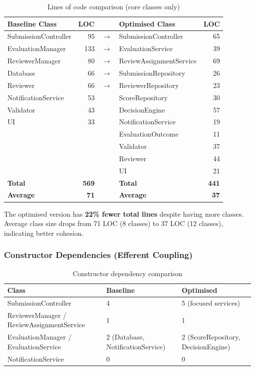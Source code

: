 \documentclass[12pt, a4paper]{article}
\begin{document}
\begin{table}[H]
\centering
\caption{Lines of code comparison (core classes only)}
\label{tab:loc}
\begin{tabular}{l r c l r}
    \toprule
    \textbf{Baseline Class} & \textbf{LOC} & & \textbf{Optimised Class} & \textbf{LOC} \\
    \midrule
    SubmissionController & 95 & $\rightarrow$ & SubmissionController & 65 \\
    EvaluationManager & 133 & $\rightarrow$ & EvaluationService & 39 \\
    ReviewerManager & 80 & $\rightarrow$ & ReviewAssignmentService & 69 \\
    Database & 66 & $\rightarrow$ & SubmissionRepository & 26 \\
    Reviewer & 66 & $\rightarrow$ & ReviewerRepository & 23 \\
    NotificationService & 53 & & ScoreRepository & 30 \\
    Validator & 43 & & DecisionEngine & 57 \\
    UI & 33 & & NotificationService & 19 \\
    & & & EvaluationOutcome & 11 \\
    & & & Validator & 37 \\
    & & & Reviewer & 44 \\
    & & & UI & 21 \\
    \midrule
    \textbf{Total} & \textbf{569} & & \textbf{Total} & \textbf{441} \\
    \textbf{Average} & \textbf{71} & & \textbf{Average} & \textbf{37} \\
    \bottomrule
\end{tabular}
\end{table}

The optimised version has \textbf{22\% fewer total lines} despite having more classes. Average class size drops from 71 LOC (8 classes) to 37 LOC (12 classes), indicating better cohesion.

\subsubsection{Constructor Dependencies (Efferent Coupling)}

\begin{table}[H]
\centering
\caption{Constructor dependency comparison}
\label{tab:coupling}
\small
\begin{tabularx}{\textwidth}{@{} p{4.5cm} p{4.5cm} X @{}}
    \toprule
    \textbf{Class} & \textbf{Baseline} & \textbf{Optimised} \\
    \midrule
    SubmissionController & 4 & 5 (focused services) \\
    ReviewerManager / ReviewAssignmentService & 1 & 1 \\
    EvaluationManager / EvaluationService & 2 (Database, NotificationService) & 2 (ScoreRepository, DecisionEngine) \\
    NotificationService & 0 & 0 \\
    \bottomrule
\end{tabularx}
\end{table}
\end{document}
